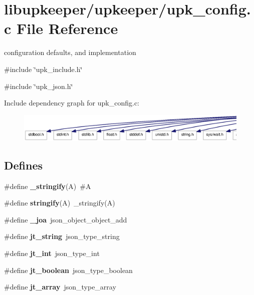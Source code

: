 \section{libupkeeper/upkeeper/upk\_\-config.c File Reference}
\label{upk__config_8c}


configuration defaults, and implementation  


{\ttfamily \#include \char`\"{}upk\_\-include.h\char`\"{}}\par
{\ttfamily \#include \char`\"{}upk\_\-json.h\char`\"{}}\par
Include dependency graph for upk\_\-config.c:
\nopagebreak
\begin{figure}[H]
\begin{center}
\leavevmode
\includegraphics[width=400pt]{upk__config_8c__incl}
\end{center}
\end{figure}
\subsection*{Defines}
\begin{DoxyCompactItemize}
\item 
\#define {\bf \_\-stringify}(A)~\#A
\item 
\#define {\bf stringify}(A)~\_\-stringify(A)
\item 
\#define {\bf \_\-joa}~json\_\-object\_\-object\_\-add
\item 
\#define {\bf jt\_\-string}~json\_\-type\_\-string
\item 
\#define {\bf jt\_\-int}~json\_\-type\_\-int
\item 
\#define {\bf jt\_\-boolean}~json\_\-type\_\-boolean
\item 
\#define {\bf jt\_\-array}~json\_\-type\_\-array
\end{DoxyCompactItemize}
